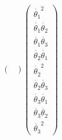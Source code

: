 \documentclass{homework}
\begin{document}
\begin{sol}
\begin{align*}
\begin{pmatrix}
  \end{pmatrix}
  \begin{pmatrix}
    \dot{\theta_1}^2 \\
    \dot{\theta_1} \dot{\theta_2} \\
    \dot{\theta_1} \dot{\theta_3} \\
    \dot{\theta_2} \dot{\theta_1} \\
    \dot{\theta_2}^2 \\
    \dot{\theta_2} \dot{\theta_3} \\
    \dot{\theta_3} \dot{\theta_1} \\
    \dot{\theta_3} \dot{\theta_2} \\
    \dot{\theta_3}^2
  \end{pmatrix} 
\end{align*}

\end{sol}

\question
\end{document}
